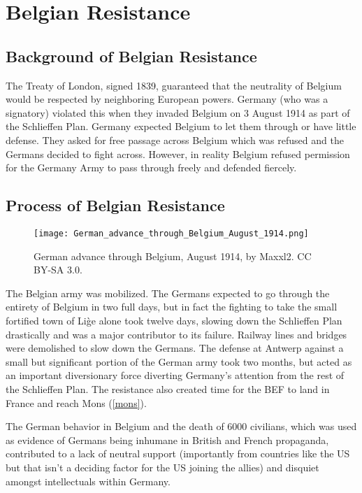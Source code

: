 \documentclass[a4paper,numbers=endperiod,most,twoside,english,final,openany]{scrbook} %
\providecommand\vref[1]{\ref{#1}}
\begin{document}

\chapter{Belgian Resistance\label{belgian}}

\section{Background of Belgian Resistance}
The Treaty of London, signed 1839, guaranteed that the neutrality of Belgium would be respected by neighboring European powers. Germany (who was a signatory) violated this when they invaded Belgium on 3 August 1914 as part of the Schlieffen Plan.  Germany expected Belgium to let them through or have little defense.  They asked for free passage across Belgium which was refused and the Germans decided to fight across.  However, in reality Belgium refused permission for the Germany Army to pass through freely and defended fiercely.

\section{Process of Belgian Resistance}

\begin{figure}
	\centering
	\texttt{[image: German\_advance\_through\_Belgium\_August\_1914.png]}
	\caption{German advance through Belgium, August 1914, by Maxxl2. CC BY-SA 3.0.}
\end{figure}

The Belgian army was mobilized.  The Germans expected to go through the entirety of Belgium in two full days, but in fact the fighting to take the small fortified town of Li\`ge alone took twelve days, slowing down the Schlieffen Plan drastically and was a major contributor to its failure.  Railway lines and bridges were demolished to slow down the Germans.  The defense at Antwerp against a small but significant portion of the German army took two months, but acted as an important diversionary force diverting Germany's attention from the rest of the Schlieffen Plan.  The resistance also created time for the BEF to land in France and reach Mons (\vref{mons}).

The German behavior in Belgium and the death of 6000 civilians, which was used as evidence of Germans being inhumane in British and French propaganda, contributed to a lack of neutral support (importantly from countries like the US but that isn't a deciding factor for the US joining the allies) and disquiet amongst intellectuals within Germany.
\end{document}
